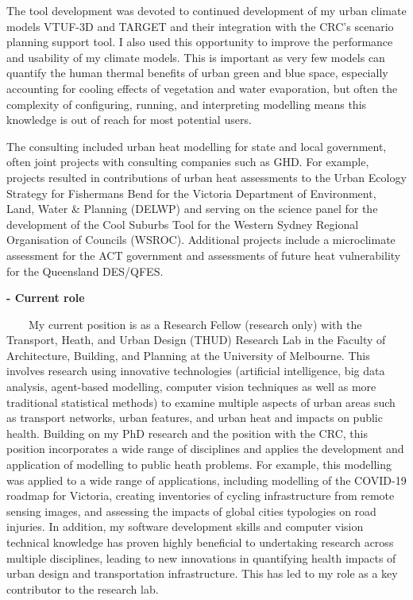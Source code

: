 The tool development was devoted to continued development of my urban climate models VTUF-3D and TARGET and their integration with the CRC's scenario planning support tool. I also used this opportunity to improve the performance and usability of my climate models. This is important as very few models can quantify the human thermal benefits of urban green and blue space, especially accounting for cooling effects of vegetation and water evaporation, but often the complexity of configuring, running, and interpreting modelling means this knowledge is out of reach for most potential users.



The consulting included urban heat modelling for state and local government, often joint projects with consulting companies such as GHD. For example, projects resulted in contributions of urban heat assessments to the Urban Ecology Strategy for Fishermans Bend for the Victoria Department of Environment, Land, Water \& Planning (DELWP) and serving on the science panel for the development of the Cool Suburbs Tool for the Western Sydney Regional Organisation of Councils (WSROC). Additional projects include a microclimate assessment for the ACT government and assessments of future heat vulnerability for the Queensland DES/QFES.


\textbf{- Current role}

~~~~My current position is as a Research Fellow (research only)  with the Transport, Heath, and Urban Design (THUD) Research Lab in the Faculty of Architecture, Building, and Planning at the University of Melbourne. This involves research using innovative technologies (artificial intelligence, big data analysis, agent-based modelling, computer vision techniques as well as more traditional statistical methods) to examine multiple aspects of urban areas such as transport networks, urban features, and urban heat and impacts on public health. Building on my PhD research and the position with the CRC, this position incorporates a wide range of disciplines and applies the development and application of modelling to public heath problems. For example, this modelling was applied to a wide range of applications, including modelling of the COVID-19 roadmap for Victoria, creating inventories of cycling infrastructure from remote sensing images, and assessing the impacts of global cities typologies on road injuries. In addition, my software development skills and computer vision technical knowledge has proven highly beneficial to undertaking research across multiple disciplines, leading to new innovations in quantifying health impacts of urban design and transportation infrastructure. This has led to my role as a key contributor to the research lab.

